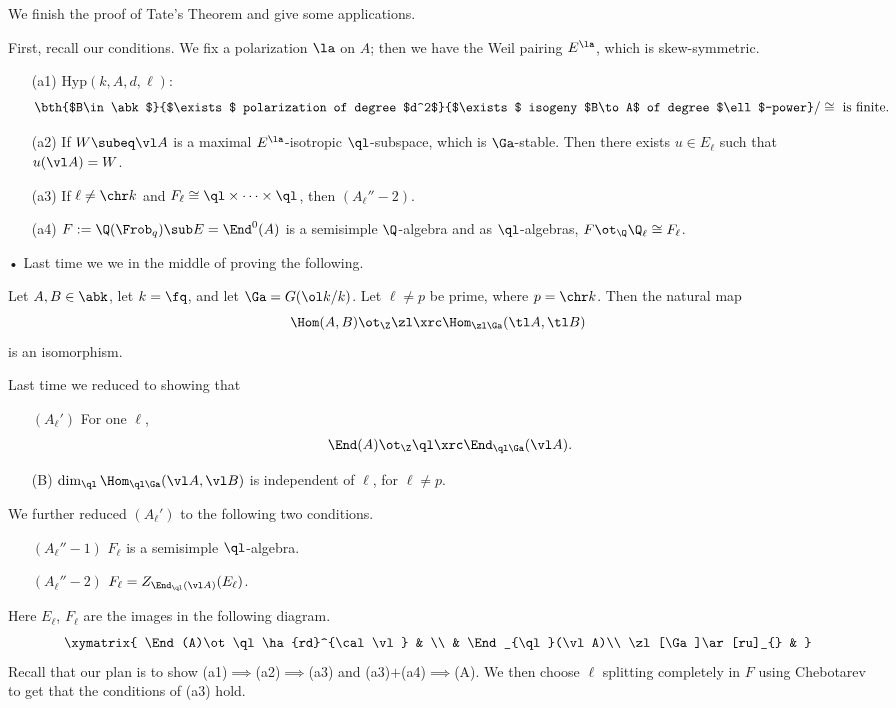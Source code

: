 
We finish the proof of Tate's Theorem and give some applications.

First, recall our conditions. We fix a polarization $\la$ on $A$; then we have the Weil pairing $E^{\la}$, which is skew-symmetric.
\begin{enumerate}
\item[(a1)]
$\text{Hyp}(k,A,d,\ell)$:
\[
\bth{$B\in\abk$}
{$\exists$ polarization of degree $d^2$}
{$\exists$ isogeny $B\to A$ of degree $\ell$-power}/\cong
\text{ is finite.}
\]
\item[(a2)]
If $W\subeq \vl A$ is a maximal $E^{\la}$-isotropic $\ql$-subspace, which is $\Ga$-stable. Then there exists $u\in E_{\ell}$ such that $u(\vl A)=W$.
\item[(a3)]
If $\ell\ne \chr k$ and $F_{\ell}\cong \ql\times \cdots \times \ql$, then $(A_{\ell}''-2)$.
\item[(a4)]
$F:=\Q(\Frob_q)\sub E=\End^0(A)$ is a semisimple $\Q$-algebra and as $\ql$-algebras, $F\ot_{\Q} \Q_{\ell}\cong F_{\ell}$. 
\end{enumerate}•
Last time we we in the middle of proving the following.
\begin{thm*}
Let $A,B\in \abk$, let $k=\fq$, and let $\Ga=G(\ol k/k)$. Let $\ell\ne p$ be prime, where $p=\chr k$. Then the natural map
\[
\Hom(A,B)\ot_{\Z}\zl \xrc \Hom_{\zl \Ga}(\tl A,\tl B)
\]
is an isomorphism.
\end{thm*}
Last time we reduced to showing that 
\begin{enumerate}
\item[$(A_{\ell}')$] For one $\ell$,
\[
\End(A)\ot_{\Z} \ql \xrc \End_{\ql \Ga} (\vl A).
\]
\item[(B)] $\dim_{\ql} \Hom_{\ql \Ga}(\vl A,\vl B)$ is independent of $\ell$, for $\ell\ne p$. 
\end{enumerate}
We further reduced $(A_{\ell}')$ to the following two conditions.
\begin{enumerate}
\item[$(A_{\ell}''-1)$] $F_{\ell}$ is a semisimple $\ql$-algebra.
\item[$(A_{\ell}''-2)$] $F_{\ell}=Z_{\End_{\ql}(\vl A)}(E_{\ell})$.  %
\end{enumerate}
Here $E_{\ell}$, $F_{\ell}$ are the images in the following diagram.
\[
\xymatrix{
\End (A)\ot \ql \ha{rd}^{\cal \vl} & \\
& \End_{\ql}(\vl A)\\
\zl[\Ga]\ar[ru]_{} & 
}
\]
Recall that our plan is to show (a1)$\implies$(a2)$\implies$(a3) and (a3)$+$(a4)$\implies$(A). %
We then choose $\ell$ splitting completely in $F$ using Chebotarev to get that the conditions of (a3) hold.

